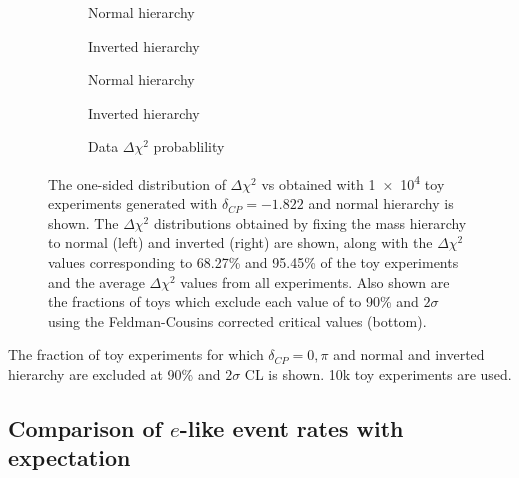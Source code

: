 \begin{figure}[htb]
	\center
	\begin{subfigure}[b]{0.49\textwidth}
		\caption{Normal hierarchy}
	\end{subfigure}
	\begin{subfigure}[b]{0.49\textwidth}
		\caption{Inverted hierarchy}
	\end{subfigure}
	\begin{subfigure}[b]{0.49\textwidth}
		\caption{Normal hierarchy}
	\end{subfigure}
	\begin{subfigure}[b]{0.49\textwidth}
		\caption{Inverted hierarchy}
	\end{subfigure}
	\begin{subfigure}[b]{0.49\textwidth}
		\caption{Data \(\Delta \chi^2\) probablility }
	\end{subfigure}
	\caption {
		The one-sided distribution of $\Delta\chi^2$ vs \deltacp obtained with \num{1e4} toy experiments generated with $\delta_{CP} = -1.822$ and normal hierarchy is shown. The $\Delta\chi^2$ distributions obtained by fixing the mass hierarchy to normal (left) and inverted (right) are shown, along with the $\Delta\chi^2$ values corresponding to 68.27\% and 95.45\% of the toy experiments and the average $\Delta\chi^2$ values from all experiments. Also shown are the fractions of toys which exclude each value of \deltacp to 90\% and $2\sigma$ using the Feldman-Cousins corrected critical values (bottom).
	}
	\label{fig:brazilian_dcp_bf}
\end{figure}

\begin{table}[htb]
	\centering
	
	\caption{
		The fraction of toy experiments for which $\delta_{CP} = 0, \pi$ and normal and inverted hierarchy are excluded at 90\% and $2\sigma$ CL is shown. 10k toy experiments are used.
	}
	\label{tab:exclusion_prob_bf}
\end{table}
\color{black}
\fi
\FloatBarrier

\subsection {Comparison of $e$-like event rates with expectation}
\label{sec:results:bievent}

